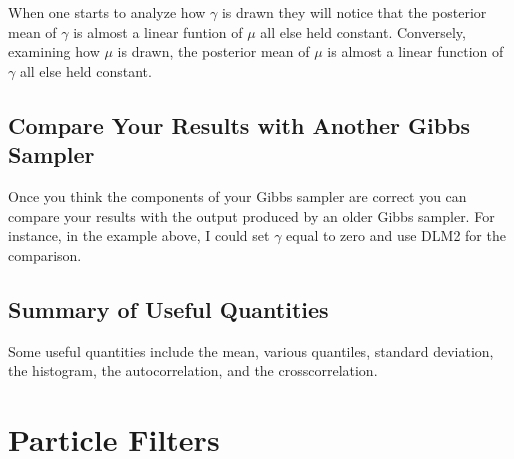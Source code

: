 \documentclass{article}
\begin{document}
\begin{figure}
\label{fig:pairwise-compare}
\end{figure}

When one starts to analyze how $\gamma$ is drawn they will notice that the posterior mean of $\gamma$ is almost a linear funtion of $\mu$ all else held constant.  Conversely, examining how $\mu$ is drawn, the posterior mean of $\mu$ is almost a linear function of $\gamma$ all else held constant.

\subsection{Compare Your Results with Another Gibbs Sampler}

Once you think the components of your Gibbs sampler are correct you can compare your results with the output produced by an older Gibbs sampler.  For instance, in the example above, I could set $\gamma$ equal to zero and use DLM2 for the comparison.

\subsection{Summary of Useful Quantities}

Some useful quantities include the mean, various quantiles, standard deviation, the histogram, the autocorrelation, and the crosscorrelation.

\section{Particle Filters}
\end{document}
